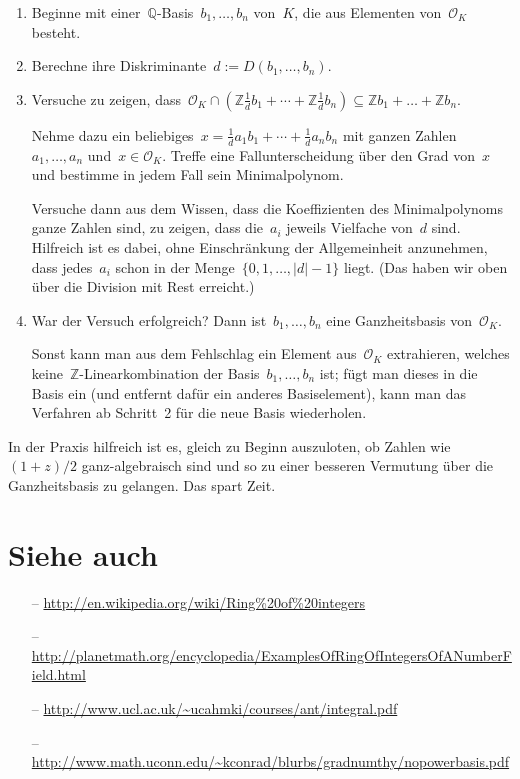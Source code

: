 \documentclass[12pt,a4paper,ngerman]{scrartcl}
\newcommand{\Q}{\mathbb{Q}}
\newcommand{\Z}{\mathbb{Z}}
\theoremstyle{definition}
\theoremstyle{plain}
\theoremstyle{remark}
\begin{document}
\begin{enumerate}
\item Beginne mit einer~$\Q$-Basis~$b_1,\ldots,b_n$ von~$K$, die aus Elementen
von~$\mathcal{O}_K$ besteht.
\item Berechne ihre Diskriminante~$d := D(b_1,\ldots,b_n)$.
\item Versuche zu zeigen, dass~$\mathcal{O}_K \cap \left(\Z \frac{1}{d}b_1
+ \cdots + \Z \frac{1}{d}b_n\right) \subseteq \Z b_1 + \ldots + \Z b_n$.

Nehme dazu ein beliebiges~$x = \frac{1}{d}a_1b_1 + \cdots + \frac{1}{d}a_nb_n$
mit ganzen Zahlen~$a_1,\ldots,a_n$ und~$x \in \mathcal{O}_K$. Treffe
eine Fallunterscheidung über den Grad von~$x$ und bestimme in jedem Fall sein
Minimalpolynom.

Versuche dann aus dem Wissen, dass die Koeffizienten des Minimalpolynoms ganze
Zahlen sind, zu zeigen, dass die~$a_i$ jeweils Vielfache von~$d$ sind.
Hilfreich ist es dabei, ohne Einschränkung der Allgemeinheit anzunehmen, dass
jedes~$a_i$ schon in der Menge~$\{ 0,1,\ldots,|d|-1 \}$ liegt. (Das haben wir
oben über die Division mit Rest erreicht.)
\item War der Versuch erfolgreich? Dann ist~$b_1,\ldots,b_n$ eine
Ganzheitsbasis von~$\mathcal{O}_K$.

Sonst kann man aus dem Fehlschlag ein Element aus~$\mathcal{O}_K$ extrahieren,
welches keine~$\Z$-Linearkombination der Basis~$b_1,\ldots,b_n$ ist; fügt man
dieses in die Basis ein (und entfernt dafür ein anderes Basiselement), kann man
das Verfahren ab Schritt~2 für die neue Basis wiederholen.
\end{enumerate}

In der Praxis hilfreich ist es, gleich zu Beginn auszuloten, ob Zahlen wie
$(1+z)/2$ ganz-algebraisch sind und so zu einer besseren
Vermutung über die Ganzheitsbasis zu gelangen. Das spart Zeit.


\section*{Siehe auch}

\scriptsize
\begin{itemize}
\item[--] \url{http://en.wikipedia.org/wiki/Ring%20of%20integers}
\item[--]
\url{http://planetmath.org/encyclopedia/ExamplesOfRingOfIntegersOfANumberField.html}
\item[--] \url{http://www.ucl.ac.uk/~ucahmki/courses/ant/integral.pdf}
\item[--]
\url{http://www.math.uconn.edu/~kconrad/blurbs/gradnumthy/nopowerbasis.pdf}
\end{itemize}
\end{document}
